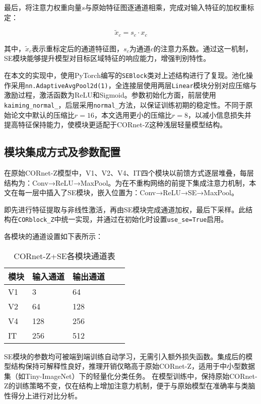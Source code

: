 最后，将注意力权重向量$s$与原始特征图逐通道相乘，完成对输入特征的加权重标定：

\begin{equation}
	\tilde{x}_c = s_c \cdot x_c
	\label{eq:se_scale}
\end{equation}

其中，$\tilde{x}_c$表示重标定后的通道特征图，$s_c$为通道$c$的注意力系数。通过这一机制，SE模块能够提升模型对目标区域特征的响应能力，增强判别特性。

在本文的实现中，使用PyTorch编写的\texttt{SEBlock}类对上述结构进行了复现。池化操作采用\texttt{nn.AdaptiveAvgPool2d(1)}，全连接层使用两层\texttt{Linear}模块分别对应压缩与激励过程，激活函数为ReLU和Sigmoid。参数初始化方面，前层使用\texttt{kaiming\_normal\_}，后层采用\texttt{normal\_}方法，以保证训练初期的稳定性。不同于原始论文中默认的压缩比$r=16$，本文选用更小的压缩比$r=8$，以减小信息损失并提高特征保持能力，使模块更适配于CORnet-Z这种浅层轻量模型结构。

\subsection{模块集成方式及参数配置}

在原始CORnet-Z模型中，V1、V2、V4、IT四个模块以前馈方式逐层堆叠，每层结构为：Conv→ReLU→MaxPool。为在不重构网络的前提下集成注意力机制，本文在每一层中插入了SE模块，嵌入位置为：Conv→ReLU→SE→MaxPool。

即先进行特征提取与非线性激活，再由SE模块完成通道加权，最后下采样。此结构在\texttt{CORblock\_Z}中统一实现，并通过在初始化时设置\texttt{use\_se=True}启用。

各模块的通道设置如下表所示：

\begin{table}[htb]
	\centering
	\caption{CORnet-Z+SE各模块通道表}
	\label{tab:CORnet-Z+SE各模块通道表}
	\begin{tabular}{lllll}
		\hline
		模块& 输入通道 & 输出通道 \\
		\hline
		V1 & 3 & 64   \\
		V2 & 64 & 128   \\
		V4 & 128 & 256   \\
		IT & 256 & 512    \\
		\hline
	\end{tabular}
\end{table}

SE模块的参数均可被端到端训练自动学习，无需引入额外损失函数。集成后的模型结构保持可解释性良好，推理开销仅略高于原始CORnet-Z，适用于中小型数据集（如Tiny-ImageNet）下的轻量化分类任务。
在模型训练中，保持原始CORnet-Z的训练策略不变，仅在结构上增加注意力机制，便于与原始模型在准确率与类脑性得分上进行对比分析。


